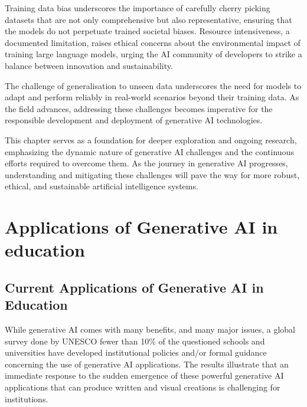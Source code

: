 \documentclass[a4paper,12pt]{report}
\begin{document}
Training data bias underscores the importance of carefully cherry picking datasets that are not only comprehensive but also representative, ensuring that the models do not perpetuate trained societal biases. Resource intensiveness, a documented limitation, raises ethical concerns about the environmental impact of training large language models, urging the AI community of developers to strike a balance between innovation and sustainability.

The challenge of generalisation to unseen data underscores the need for models to adapt and perform reliably in real-world scenarios beyond their training data. As the field advances, addressing these challenges becomes imperative for the responsible development and deployment of generative AI technologies.

This chapter serves as a foundation for deeper exploration and ongoing research, emphasizing the dynamic nature of generative AI challenges and the continuous efforts required to overcome them. As the journey in generative AI progresses, understanding and mitigating these challenges will pave the way for more robust, ethical, and sustainable artificial intelligence systems.

\newpage
\chapter{Applications of Generative AI in education} \label{chap:application}
\newpage
\section{Current Applications of Generative AI in Education} \label{sect:current}
\hspace{10mm} While generative AI comes with many benefits, and many major issues, a global survey done by UNESCO \cite{western-adoption} \cite{western-adoption2} fewer than 10\% of the questioned schools and universities have developed institutional policies and/or formal guidance concerning the use of generative AI applications. The results illustrate that an immediate response to the sudden emergence of these powerful generative AI applications that can produce written and visual creations is challenging for institutions.
\end{document}
